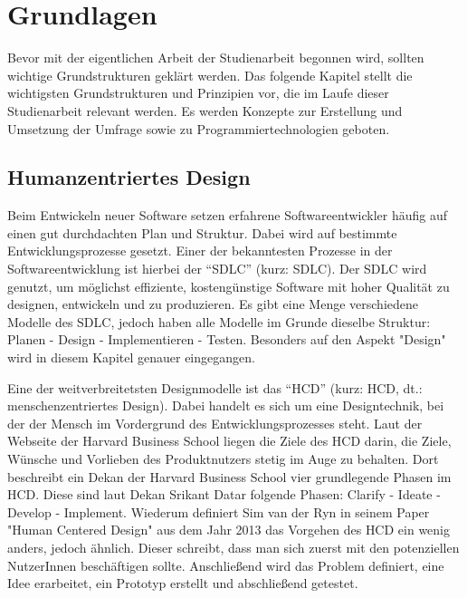 
\chapter{Grundlagen}
\label{chapter:3}

Bevor mit der eigentlichen Arbeit der Studienarbeit begonnen wird, sollten wichtige Grundstrukturen geklärt werden. Das folgende Kapitel stellt die wichtigsten Grundstrukturen und Prinzipien vor, die im Laufe dieser Studienarbeit relevant werden. Es werden Konzepte zur Erstellung und Umsetzung der Umfrage sowie zu Programmiertechnologien geboten.

\section{Humanzentriertes Design}

Beim Entwickeln neuer Software setzen erfahrene Softwareentwickler häufig auf einen gut durchdachten Plan und Struktur. Dabei wird auf bestimmte Entwicklungsprozesse gesetzt. Einer der bekanntesten Prozesse in der Softwareentwicklung ist hierbei der “\acf{SDLC}” (kurz: \acs{SDLC}). Der \acs{SDLC} wird genutzt, um möglichst effiziente, kostengünstige Software mit hoher Qualität zu designen, entwickeln und zu produzieren.\cite{shylesh:2017} Es gibt eine Menge verschiedene Modelle des \acs{SDLC}, jedoch haben alle Modelle im Grunde dieselbe Struktur: Planen - Design - Implementieren - Testen. Besonders auf den Aspekt "Design" wird in diesem Kapitel genauer eingegangen.

Eine der weitverbreitetsten Designmodelle ist das “\acf{HCD}” (kurz: \acs{HCD}, dt.: menschenzentriertes Design). Dabei handelt es sich um eine Designtechnik, bei der der Mensch im Vordergrund des Entwicklungsprozesses steht. Laut der Webseite der Harvard Business School liegen die Ziele des \acs{HCD} darin, die Ziele, Wünsche und Vorlieben des Produktnutzers stetig im Auge zu behalten. Dort beschreibt ein Dekan der Harvard Business School vier grundlegende Phasen im \acs{HCD}. Diese sind laut Dekan Srikant Datar folgende Phasen: Clarify - Ideate - Develop - Implement. Wiederum definiert Sim van der Ryn in seinem Paper "Human Centered Design" aus dem Jahr 2013 das Vorgehen des \acs{HCD} ein wenig anders, jedoch ähnlich. Dieser schreibt, dass man sich zuerst mit den potenziellen NutzerInnen beschäftigen sollte. Anschließend wird das Problem definiert, eine Idee erarbeitet, ein Prototyp erstellt und abschließend getestet.\cite{vanderryn:2013, hbsc:2020}

